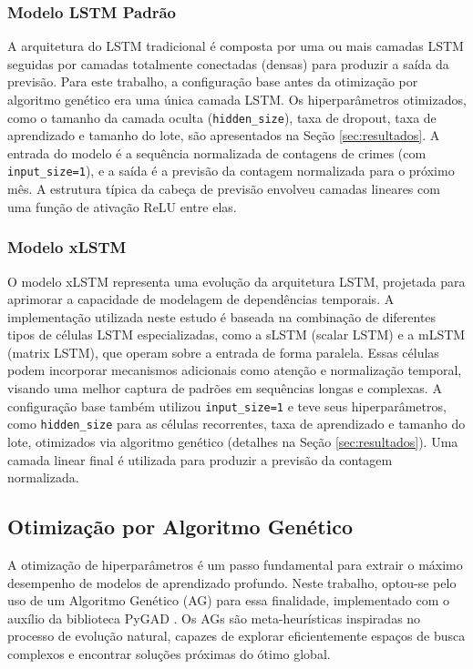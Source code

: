 \documentclass[conference]{IEEEtran}
\begin{document}
\subsubsection{Modelo LSTM Padrão}
A arquitetura do LSTM tradicional é composta por uma ou mais camadas LSTM seguidas por camadas totalmente conectadas (densas) para produzir a saída da previsão. Para este trabalho, a configuração base antes da otimização por algoritmo genético era uma única camada LSTM. Os hiperparâmetros otimizados, como o tamanho da camada oculta (\texttt{hidden\_size}), taxa de dropout, taxa de aprendizado e tamanho do lote, são apresentados na Seção \ref{sec:resultados}. A entrada do modelo é a sequência normalizada de contagens de crimes (com \texttt{input\_size=1}), e a saída é a previsão da contagem normalizada para o próximo mês. A estrutura típica da cabeça de previsão envolveu camadas lineares com uma função de ativação ReLU entre elas.

\subsubsection{Modelo xLSTM}
O modelo xLSTM representa uma evolução da arquitetura LSTM, projetada para aprimorar a capacidade de modelagem de dependências temporais. A implementação utilizada neste estudo é baseada na combinação de diferentes tipos de células LSTM especializadas, como a sLSTM (scalar LSTM) e a mLSTM (matrix LSTM), que operam sobre a entrada de forma paralela. Essas células podem incorporar mecanismos adicionais como atenção e normalização temporal, visando uma melhor captura de padrões em sequências longas e complexas. A configuração base também utilizou \texttt{input\_size=1} e teve seus hiperparâmetros, como \texttt{hidden\_size} para as células recorrentes, taxa de aprendizado e tamanho do lote, otimizados via algoritmo genético (detalhes na Seção \ref{sec:resultados}). Uma camada linear final é utilizada para produzir a previsão da contagem normalizada.

\subsection{Otimização por Algoritmo Genético}
A otimização de hiperparâmetros é um passo fundamental para extrair o máximo desempenho de modelos de aprendizado profundo. Neste trabalho, optou-se pelo uso de um Algoritmo Genético (AG) para essa finalidade, implementado com o auxílio da biblioteca PyGAD \cite{b4}. Os AGs são meta-heurísticas inspiradas no processo de evolução natural, capazes de explorar eficientemente espaços de busca complexos e encontrar soluções próximas do ótimo global.
\end{document}
